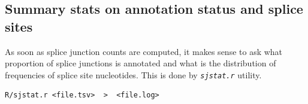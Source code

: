 \documentclass{article}
\newcommand{\prog}[1]{{\tt\em #1}}
\begin{document}
\subsection{Summary stats on annotation status and splice sites}
As soon as splice junction counts are computed, it makes sense to ask what proportion of splice junctions is annotated and what is the distribution of
frequencies of splice site nucleotides. This is done by \prog{sjstat.r} utility.
\begin{verbatim}
R/sjstat.r <file.tsv>  >  <file.log>
\end{verbatim}



\end{document}
